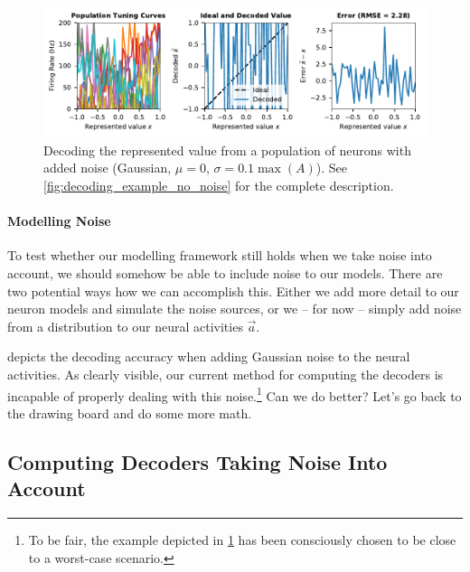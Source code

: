 \documentclass[10pt,letterpaper,oneside]{article}
\begin{document}
\begin{figure}
	\centering
	\includegraphics{media/decoding_example_noise.pdf}
	\caption{Decoding the represented value from a population of neurons with added noise (Gaussian, $\mu = 0$, $\sigma = 0.1 \max(A)$). See \cref{fig:decoding_example_no_noise} for the complete description. }
	\label{fig:decoding_example_noise}
\end{figure}


\paragraph{Modelling Noise}
To test whether our modelling framework still holds when we take noise into account, we should somehow be able to include noise to our models. There are two potential ways how we can accomplish this. Either we add more detail to our neuron models and simulate the noise sources, or we -- for now -- simply add noise from a distribution to our neural activities $\vec a$.

 depicts the decoding accuracy when adding Gaussian noise to the neural activities. As clearly visible, our current method for computing the decoders is incapable of properly dealing with this noise.\footnote{To be fair, the example depicted in \cref{fig:decoding_example_noise} has been consciously chosen to be close to a worst-case scenario.} Can we do better? Let's go back to the drawing board and do some more math.

\subsection{Computing Decoders Taking Noise Into Account}
\end{document}
